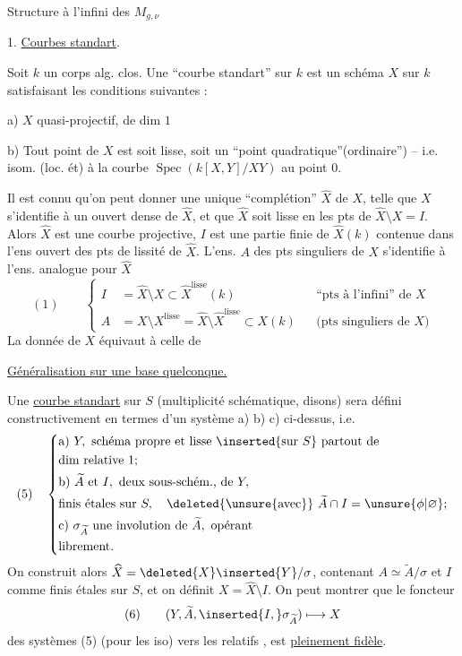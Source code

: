 Structure à l'infini des $M_{g,\nu}$

1. \uline{Courbes standart}.

Soit $k$ un corps alg. clos. Une ``courbe standart'' sur $k$ est un schéma $X$ sur $k$ satisfaisant les conditions suivantes :

a) $X$ quasi-projectif,  de dim $1$

b) Tout point de $X$ est soit lisse, soit un ``point quadratique''(ordinaire'') -- i.e. isom. (loc. ét) à la courbe $\operatorname{Spec}(k[X,Y]/XY)$ au point $0$.

Il est connu qu'on peut donner une unique ``complétion'' $\widehat X$ de $X$, telle que  $X$ s'identifie à un ouvert dense de $\widehat X$, et que $\widehat X$ soit lisse en les pts de $\widehat X\setminus X=I$. Alors $\widehat X$ est une courbe projective, $I$ est  une partie finie de $\widehat X(k)$ contenue dans l'ens ouvert des pts de lissité de $\widehat X$. L'ens. $A$ des pts singuliers de $X$ s'identifie à l'ens. analogue pour $\widehat X$
\[
(1)\qquad
\left\{\begin{aligned}
I&=\widehat X\setminus X\subset\widehat X^{\mathrm{lisse}}(k)
&&\text{``pts à l'infini'' de }X\\
A&=X\setminus X^{\mathrm{lisse}}=\widehat X\setminus\widehat X^{\mathrm{lisse}}\subset X(k)
&&\text{(pts singuliers de }X\text{)}
\end{aligned}\right.
\]
La donnée de $X$ équivaut à celle de

\uline{Généralisation sur une base quelconque.}

Une \uline{courbe standart} sur $S$ (multiplicité schématique, disons) sera défini constructivement en termes d'un système a) b) c)  ci-dessus, i.e.
\[
(5)\quad\left\{\begin{aligned}
&\text{a) }Y,\text{ schéma propre et lisse }\inserted{\text{sur }S}\text{ partout de}\\
&\text{dim relative }1;\\
&\text{b) }\widetilde A\text{ et }I,\text{ deux sous-schém., de }Y,\\
&\text{finis étales sur }S,\quad\deleted{\unsure{\text{avec}}}\ \widetilde A\cap I=\unsure{\phi|\varnothing};\\
&\text{c) }\sigma_{\widetilde A}\text{ une involution de }\widetilde A,\text{ opérant}\\
&\text{librement.}
\end{aligned}\right.
\]
On construit alors $\widehat X=\deleted{X}\inserted{Y}/\sigma$, contenant $A\simeq\widetilde A/\sigma$ et $I$ comme   finis étales sur $S$, et on définit $X=\widehat X\setminus I$. On peut montrer que le foncteur
\[
(6)\qquad(Y,\widetilde A,\inserted{I,}\sigma_{\widetilde A})\longmapsto X
\]
des systèmes (5) (pour les iso) vers les  relatifs , est \uline{pleinement fidèle}.

